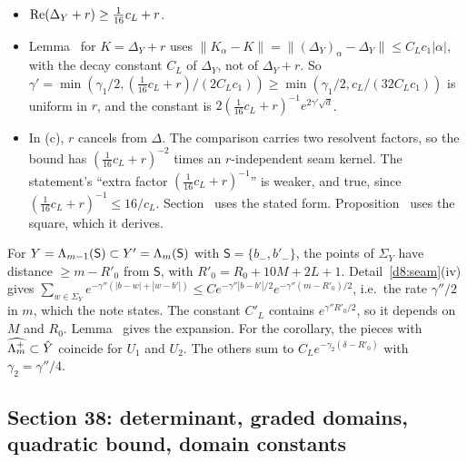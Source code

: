 \begin{detail}
\begin{step}[(c)]
\end{step}
\begin{step}[(d)]
\begin{itemize}
\item $\operatorname{Re}(\Delta_Y+r)\ge\frac1{16}c_L+r$.
\item Lemma~ for $K=\Delta_Y+r$ uses $\|K_\alpha-K\|=\|(\Delta_Y)_\alpha-\Delta_Y\|\le C_Lc_1|\alpha|$, with the decay constant $C_L$ of $\Delta_Y$, not of $\Delta_Y+r$. So $\gamma'=\min(\gamma_1/2,(\frac1{16}c_L+r)/(2C_Lc_1))\ge\min(\gamma_1/2,c_L/(32C_Lc_1))$ is uniform in $r$, and the constant is $2(\frac1{16}c_L+r)^{-1}e^{2\gamma'\sqrt d}$.
\item In (c), $r$ cancels from $\Delta$. The comparison carries two resolvent factors, so the bound has $(\frac1{16}c_L+r)^{-2}$ times an $r$-independent seam kernel. The statement's ``extra factor $(\frac1{16}c_L+r)^{-1}$'' is weaker, and true, since $(\frac1{16}c_L+r)^{-1}\le16/c_L$. Section~ uses the stated form. Proposition~ uses the square, which it derives.
\end{itemize}
\end{step}
\end{detail}

\begin{detail}\label{d8:localcov}
For $Y=\Lambda_{m-1}(\mathsf S)\subset Y'=\Lambda_m(\mathsf S)$ with $\mathsf S=\{b_-,b'_-\}$, the points of $\Sigma_Y$ have distance $\ge m-R'_0$ from $\mathsf S$, with $R'_0=R_0+10M+2L+1$. Detail~\ref{d8:seam}(iv) gives $\sum_{w\in\Sigma_Y}e^{-\gamma''(|b-w|+|w-b'|)}\le Ce^{-\gamma''|b-b'|/2}e^{-\gamma''(m-R'_0)/2}$, i.e.\ the rate $\gamma''/2$ in $m$, which the note states. The constant $C'_L$ contains $e^{\gamma''R'_0/2}$, so it depends on $M$ and $R_0$. Lemma~ gives the expansion. For the corollary, the pieces with $\widehat{\Lambda_m^+}\subset\hat Y$ coincide for $U_1$ and $U_2$. The others sum to $C_Le^{-\gamma_2(\delta-R'_0)}$ with $\gamma_2=\gamma''/4$.
\end{detail}


\subsection{Section 38: determinant, graded domains, quadratic bound, domain constants}\label{d8:s38}

